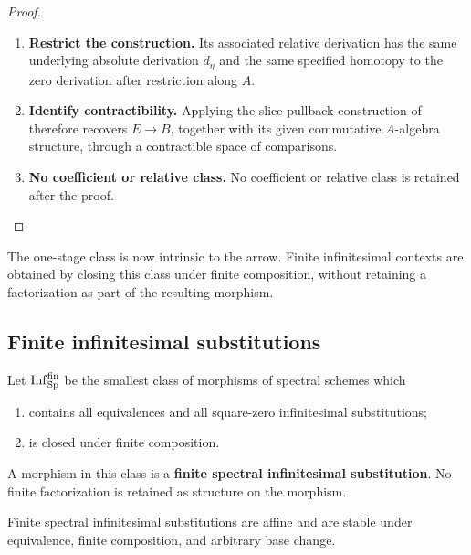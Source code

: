 \begin{proof}
\begin{enumerate}[label=\textup{(\arabic*)}]
    \item \textbf{Restrict the construction.}
    Its associated relative derivation has the same underlying absolute derivation \(d_\eta\)
    and the same specified homotopy to the zero derivation after restriction along \(A\).

    \item \textbf{Identify contractibility.}
    Applying the slice pullback construction of 
    therefore recovers \(E\to B\), together with its given commutative \(A\)-algebra
    structure, through a contractible space of comparisons.

    \item \textbf{No coefficient or relative class.}
    No coefficient or relative class is retained after the proof.
\end{enumerate}
\end{proof}
The one-stage class is now intrinsic to the arrow. Finite infinitesimal
contexts are obtained by closing this class under finite composition, without
retaining a factorization as part of the resulting morphism.

\subsection{Finite infinitesimal substitutions}

\begin{definition}
\label{def:finite-spectral-infinitesimal-substitution}
Let \(\operatorname{Inf}^{\mathrm{fin}}_{\operatorname{Sp}}\) be the smallest class of
morphisms of spectral schemes which
\begin{enumerate}[label=(\roman*)]
    \item contains all equivalences and all square-zero infinitesimal
    substitutions;
    \item is closed under finite composition.
\end{enumerate}
A morphism in this class is a \textbf{finite spectral infinitesimal
substitution}. No finite factorization is retained as structure on the
morphism.
\end{definition}

\begin{proposition}
\label{prop:finite-infinitesimal-permanence}
Finite spectral infinitesimal substitutions are affine and are stable under
equivalence, finite composition, and arbitrary base change.
\end{proposition}

